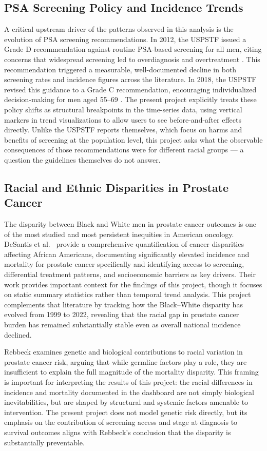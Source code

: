 \documentclass[12pt]{article}
\begin{document}
\subsection{PSA Screening Policy and Incidence Trends}

A critical upstream driver of the patterns observed in this analysis is the evolution
of PSA screening recommendations. In 2012, the USPSTF issued a Grade D recommendation
against routine PSA-based screening for all men, citing concerns that widespread
screening led to overdiagnosis and overtreatment \cite{uspstf2012}. This recommendation
triggered a measurable, well-documented decline in both screening rates and incidence
figures across the literature. In 2018, the USPSTF revised this guidance to a Grade C
recommendation, encouraging individualized decision-making for men aged 55--69
\cite{uspstf2018}. The present project explicitly treats these policy shifts as
structural breakpoints in the time-series data, using vertical markers in trend
visualizations to allow users to see before-and-after effects directly. Unlike the
USPSTF reports themselves, which focus on harms and benefits of screening at the
population level, this project asks what the observable consequences of those
recommendations were for different racial groups --- a question the guidelines
themselves do not answer.

\subsection{Racial and Ethnic Disparities in Prostate Cancer}

The disparity between Black and White men in prostate cancer outcomes is one of the
most studied and most persistent inequities in American oncology. DeSantis et al.\
\cite{desantis2019} provide a comprehensive quantification of cancer disparities
affecting African Americans, documenting significantly elevated incidence and
mortality for prostate cancer specifically and identifying access to screening,
differential treatment patterns, and socioeconomic barriers as key drivers. Their
work provides important context for the findings of this project, though it focuses
on static summary statistics rather than temporal trend analysis. This project
complements that literature by tracking how the Black--White disparity has evolved
from 1999 to 2022, revealing that the racial gap in prostate cancer burden has
remained substantially stable even as overall national incidence declined.

Rebbeck \cite{rebbeck2017} examines genetic and biological contributions to racial
variation in prostate cancer risk, arguing that while germline factors play a role,
they are insufficient to explain the full magnitude of the mortality disparity. This
framing is important for interpreting the results of this project: the racial
differences in incidence and mortality documented in the dashboard are not simply
biological inevitabilities, but are shaped by structural and systemic factors
amenable to intervention. The present project does not model genetic risk directly,
but its emphasis on the contribution of screening access and stage at diagnosis to
survival outcomes aligns with Rebbeck's conclusion that the disparity is substantially
preventable.
\end{document}
